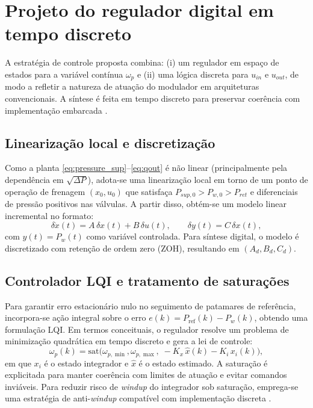 \documentclass[a4paper]{ifacconf}
\begin{document}
\section{Projeto do regulador digital em tempo discreto}
\label{sec:controle}
A estratégia de controle proposta combina: (i) um regulador em espaço de estados para a variável contínua $\omega_p$ e (ii) uma lógica discreta para $u_{in}$ e $u_{out}$, de modo a refletir a natureza de atuação do modulador em arquiteturas convencionais. A síntese é feita em tempo discreto para preservar coerência com implementação embarcada \cite{FranklinPowellWorkman1998,Ogata1997}.

\subsection{Linearização local e discretização}
Como a planta \eqref{eq:pressure_sup}--\eqref{eq:qout} é não linear (principalmente pela dependência em $\sqrt{\Delta P}$), adota-se uma linearização local em torno de um ponto de operação de frenagem $(x_0,u_0)$ que satisfaça $P_{sup,0}>P_{w,0}>P_{ret}$ e diferenciais de pressão positivos nas válvulas. A partir disso, obtém-se um modelo linear incremental no formato:
\begin{equation}
   \delta \dot{x}(t)=A\,\delta x(t)+B\,\delta u(t),
   \qquad
   \delta y(t)=C\,\delta x(t),
   \label{eq:lin_ss}
\end{equation}
com $y(t)=P_w(t)$ como variável controlada. Para síntese digital, o modelo é discretizado com retenção de ordem zero (ZOH), resultando em $(A_d,B_d,C_d)$.

\subsection{Controlador LQI e tratamento de saturações}
Para garantir erro estacionário nulo no seguimento de patamares de referência, incorpora-se ação integral sobre o erro $e(k)=P_{\mathrm{ref}}(k)-P_w(k)$, obtendo uma formulação LQI. Em termos conceituais, o regulador resolve um problema de minimização quadrática em tempo discreto e gera a lei de controle:
\begin{equation}
   \omega_p(k) = \mathrm{sat}\big(\omega_{p,\min},\omega_{p,\max},\; -K_x\,\hat{x}(k)-K_i\,x_i(k)\big),
   \label{eq:lqi_control}
\end{equation}
em que $x_i$ é o estado integrador e $\hat{x}$ é o estado estimado. A saturação é explicitada para manter coerência com limites de atuação e evitar comandos inviáveis. Para reduzir risco de \textit{windup} do integrador sob saturação, emprega-se uma estratégia de anti-\textit{windup} compatível com implementação discreta \cite{FranklinPowellWorkman1998,Ogata1997}.
\end{document}
